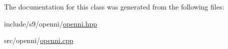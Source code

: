 The documentation for this class was generated from the following files\-:\begin{DoxyCompactItemize}
\item 
include/s9/openni/\hyperlink{openni_8hpp}{openni.\-hpp}\item 
src/openni/\hyperlink{openni_8cpp}{openni.\-cpp}\end{DoxyCompactItemize}

